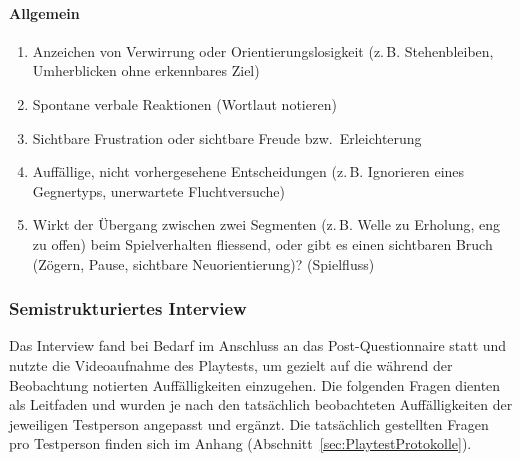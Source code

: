 \documentclass[../Main.tex]{subfiles}
\begin{document}
\paragraph{Allgemein}
\begin{enumerate}[label=\textbf{B\arabic*}, leftmargin=1.5cm, itemsep=0.5em, resume]
    \item Anzeichen von Verwirrung oder Orientierungslosigkeit (z.\,B. Stehenbleiben, Umherblicken ohne erkennbares Ziel)
    \item Spontane verbale Reaktionen (Wortlaut notieren)
    \item Sichtbare Frustration oder sichtbare Freude bzw.\ Erleichterung
    \item Auffällige, nicht vorhergesehene Entscheidungen (z.\,B. Ignorieren eines Gegnertyps, unerwartete Fluchtversuche)
    \item Wirkt der Übergang zwischen zwei Segmenten (z.\,B. Welle zu Erholung, eng zu offen) beim Spielverhalten fliessend, oder gibt es einen sichtbaren Bruch (Zögern, Pause, sichtbare Neuorientierung)? \hfill (Spielfluss)
\end{enumerate}

\subsubsection{Semistrukturiertes Interview} \label{sec:Interview}

Das Interview fand bei Bedarf im Anschluss an das Post-Questionnaire statt und nutzte die Videoaufnahme des Playtests, um gezielt auf die während der Beobachtung notierten Auffälligkeiten einzugehen. Die folgenden Fragen dienten als Leitfaden und wurden je nach den tatsächlich beobachteten Auffälligkeiten der jeweiligen Testperson angepasst und ergänzt. Die tatsächlich gestellten Fragen pro Testperson finden sich im Anhang (Abschnitt~\ref{sec:PlaytestProtokolle}).
\end{document}

